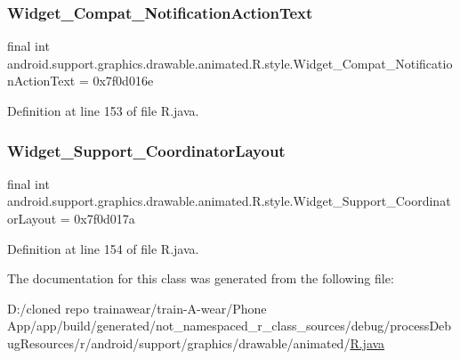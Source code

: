 \subsubsection{\texorpdfstring{Widget\_Compat\_NotificationActionText}{Widget\_Compat\_NotificationActionText}}
{\footnotesize\ttfamily final int android.\+support.\+graphics.\+drawable.\+animated.\+R.\+style.\+Widget\+\_\+\+Compat\+\_\+\+Notification\+Action\+Text = 0x7f0d016e\hspace{0.3cm}{\ttfamily [static]}}



Definition at line 153 of file R.\+java.

\mbox{\label{classandroid_1_1support_1_1graphics_1_1drawable_1_1animated_1_1_r_1_1style_ac8e8534d89e4b29ea3a9f34f37f559b2}} 
\subsubsection{\texorpdfstring{Widget\_Support\_CoordinatorLayout}{Widget\_Support\_CoordinatorLayout}}
{\footnotesize\ttfamily final int android.\+support.\+graphics.\+drawable.\+animated.\+R.\+style.\+Widget\+\_\+\+Support\+\_\+\+Coordinator\+Layout = 0x7f0d017a\hspace{0.3cm}{\ttfamily [static]}}



Definition at line 154 of file R.\+java.



The documentation for this class was generated from the following file\+:\begin{DoxyCompactItemize}
\item 
D\+:/cloned repo trainawear/train-\/\+A-\/wear/\+Phone App/app/build/generated/not\+\_\+namespaced\+\_\+r\+\_\+class\+\_\+sources/debug/process\+Debug\+Resources/r/android/support/graphics/drawable/animated/\mbox{\hyperlink{process_debug_resources_2r_2android_2support_2graphics_2drawable_2animated_2_r_8java}{R.\+java}}\end{DoxyCompactItemize}
